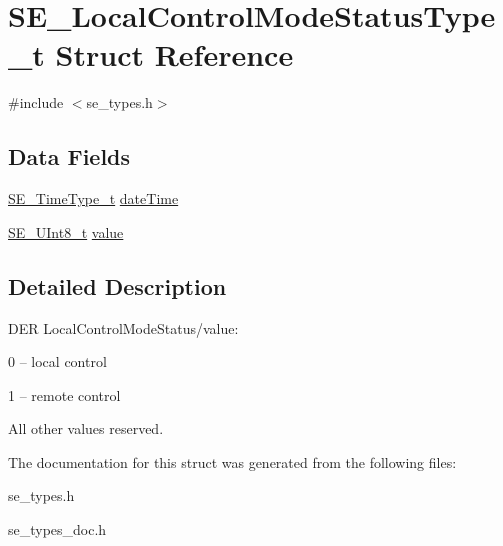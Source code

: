 \hypertarget{structSE__LocalControlModeStatusType__t}{}\section{S\+E\+\_\+\+Local\+Control\+Mode\+Status\+Type\+\_\+t Struct Reference}
\label{structSE__LocalControlModeStatusType__t}


{\ttfamily \#include $<$se\+\_\+types.\+h$>$}

\subsection*{Data Fields}
\begin{DoxyCompactItemize}
\item 
\hyperlink{group__TimeType_ga6fba87a5b57829b4ff3f0e7638156682}{S\+E\+\_\+\+Time\+Type\+\_\+t} \hyperlink{group__LocalControlModeStatusType_gaa79487aaca6ea9a486b2513a4f668cae}{date\+Time}
\item 
\hyperlink{group__UInt8_gaf7c365a1acfe204e3a67c16ed44572f5}{S\+E\+\_\+\+U\+Int8\+\_\+t} \hyperlink{group__LocalControlModeStatusType_ga6402cc57eae81561c6f80db12cb16705}{value}
\end{DoxyCompactItemize}


\subsection{Detailed Description}
D\+ER Local\+Control\+Mode\+Status/value\+:

0 – local control

1 – remote control

All other values reserved. 

The documentation for this struct was generated from the following files\+:\begin{DoxyCompactItemize}
\item 
se\+\_\+types.\+h\item 
se\+\_\+types\+\_\+doc.\+h\end{DoxyCompactItemize}
